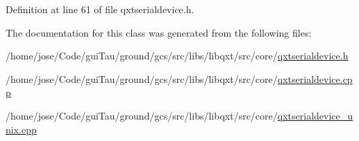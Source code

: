 Definition at line 61 of file qxtserialdevice.\-h.



The documentation for this class was generated from the following files\-:\begin{DoxyCompactItemize}
\item 
/home/jose/\-Code/gui\-Tau/ground/gcs/src/libs/libqxt/src/core/\hyperlink{qxtserialdevice_8h}{qxtserialdevice.\-h}\item 
/home/jose/\-Code/gui\-Tau/ground/gcs/src/libs/libqxt/src/core/\hyperlink{qxtserialdevice_8cpp}{qxtserialdevice.\-cpp}\item 
/home/jose/\-Code/gui\-Tau/ground/gcs/src/libs/libqxt/src/core/\hyperlink{qxtserialdevice__unix_8cpp}{qxtserialdevice\-\_\-unix.\-cpp}\end{DoxyCompactItemize}
